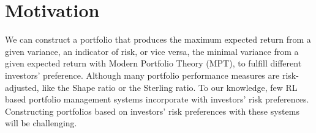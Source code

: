\section {Motivation}
We can construct a portfolio that produces the maximum expected return from a given variance, an indicator of risk, or vice versa, the minimal variance from a given expected return with Modern Portfolio Theory (MPT), \cite{10.2307/2975974} to fulfill different investors' preference.
Although many portfolio performance measures are risk-adjusted\cite{cogneau2009101}, like the Shape ratio\cite{Sharpe49} or the Sterling ratio\cite{magdon2004maximum}. To our knowledge, few RL based portfolio management systems incorporate with investors' risk preferences. Constructing portfolios based on investors' risk preferences with these systems will be challenging.